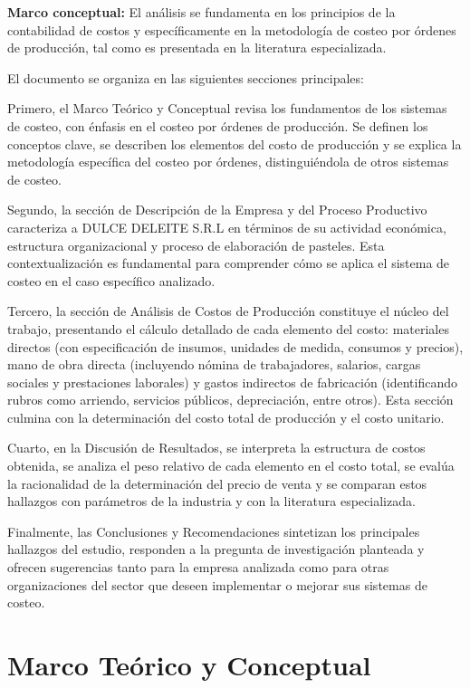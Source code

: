\documentclass[
  stu,
  floatsintext,
  longtable,
  a4paper,
  nolmodern,
  notxfonts,
  notimes,
  12pt,
  colorlinks=true,linkcolor=blue,citecolor=blue,urlcolor=blue]{apa7}
\begin{document}
\textbf{Marco conceptual:} El análisis se fundamenta en los principios
de la contabilidad de costos y específicamente en la metodología de
costeo por órdenes de producción, tal como es presentada en la
literatura especializada.

El documento se organiza en las siguientes secciones principales:

Primero, el Marco Teórico y Conceptual revisa los fundamentos de los
sistemas de costeo, con énfasis en el costeo por órdenes de producción.
Se definen los conceptos clave, se describen los elementos del costo de
producción y se explica la metodología específica del costeo por
órdenes, distinguiéndola de otros sistemas de costeo.

Segundo, la sección de Descripción de la Empresa y del Proceso
Productivo caracteriza a DULCE DELEITE S.R.L en términos de su actividad
económica, estructura organizacional y proceso de elaboración de
pasteles. Esta contextualización es fundamental para comprender cómo se
aplica el sistema de costeo en el caso específico analizado.

Tercero, la sección de Análisis de Costos de Producción constituye el
núcleo del trabajo, presentando el cálculo detallado de cada elemento
del costo: materiales directos (con especificación de insumos, unidades
de medida, consumos y precios), mano de obra directa (incluyendo nómina
de trabajadores, salarios, cargas sociales y prestaciones laborales) y
gastos indirectos de fabricación (identificando rubros como arriendo,
servicios públicos, depreciación, entre otros). Esta sección culmina con
la determinación del costo total de producción y el costo unitario.

Cuarto, en la Discusión de Resultados, se interpreta la estructura de
costos obtenida, se analiza el peso relativo de cada elemento en el
costo total, se evalúa la racionalidad de la determinación del precio de
venta y se comparan estos hallazgos con parámetros de la industria y con
la literatura especializada.

Finalmente, las Conclusiones y Recomendaciones sintetizan los
principales hallazgos del estudio, responden a la pregunta de
investigación planteada y ofrecen sugerencias tanto para la empresa
analizada como para otras organizaciones del sector que deseen
implementar o mejorar sus sistemas de costeo.

\section{Marco Teórico y
Conceptual}\label{marco-teuxf3rico-y-conceptual}
\end{document}
